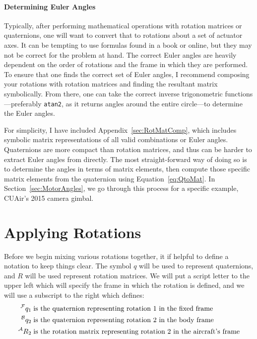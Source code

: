 \documentclass[letterpaper,10pt]{article}
\newcommand\leftidx[3]{%
  {\vphantom{#2}}#1#2#3%
}
\begin{document}
\paragraph{Determining Euler Angles}
\label{sec:DetEulerAngles}
Typically, after performing mathematical operations with rotation matrices or quaternions, one will want to convert that to rotations about a set of actuator axes. It can be tempting to use formulas found in a book or online, but they may not be correct for the problem at hand. The correct Euler angles are heavily dependent on the order of rotations and the frame in which they are performed. To ensure that one finds the correct set of Euler angles, I recommend composing your rotations with rotation matrices and finding the resultant matrix symbolically. From there, one can take the correct inverse trigonometric functions---preferably \texttt{atan2}, as it returns angles around the entire circle---to determine the Euler angles.

For simplicity, I have included Appendix~\ref{sec:RotMatComp}, which includes symbolic matrix representations of all valid combinations or Euler angles. Quaternions are more compact than rotation matrices, and thus can be harder to extract Euler angles from directly. The most straight-forward way of doing so is to determine the angles in terms of matrix elements, then compute those specific matrix elements from the quaternion using Equation~\ref{eq:QtoMat}. In Section~\ref{sec:MotorAngles}, we go through this process for a specific example, CUAir's 2015 camera gimbal. 

\section{Applying Rotations}
Before we begin mixing various rotations together, it if helpful to define a notation to keep things clear. The symbol $q$ will be used to represent quaternions, and $R$ will be used represent rotation matrices. We will put a script letter to the upper left which will specify the frame in which the rotation is defined, and we will use a subscript to the right which defines:
\begin{align}
\leftidx{^\mathcal{F}}{q}{_1} & \; \text{is the quaternion representing rotation 1 in the fixed frame} \\
\leftidx{^\mathcal{B}}{q}{_2} & \; \text{is the quaternion representing rotation 2 in the body frame} \\
\leftidx{^\mathcal{A}}{R}{_2} & \; \text{is the rotation matrix representing rotation 2 in the aircraft's frame}
\end{align}
\end{document}
